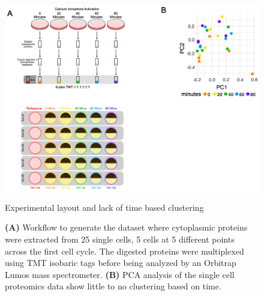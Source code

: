 \beginsupplement


\begin{figure}[hbt!]
\centering
\includegraphics[width=14cm, keepaspectratio]{figs/paper2/figS1.png}
\caption{Experimental layout and lack of time based clustering}
\caption*{\textbf{(A)} Workflow to generate the dataset where cytoplasmic proteins were extracted from 25 single cells, 5 cells at 5 different points across the first cell cycle. The digested proteins were multiplexed using TMT isobaric tags before being analyzed by an Orbitrap Lumos mass spectrometer. \textbf{(B)} PCA analysis of the single cell proteomics data show little to no clustering based on time.}
\label{fig:paper2_figS1}
\end{figure}